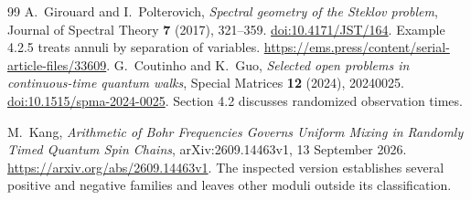 \documentclass[11pt,a4paper]{article}
\theoremstyle{definition}\newtheorem{definition}[theorem]{Definition}
\theoremstyle{remark}\newtheorem{remark}[theorem]{Remark}
\begin{document}
\begin{thebibliography}{99}
A.~Girouard and I.~Polterovich,
\emph{Spectral geometry of the Steklov problem},
Journal of Spectral Theory \textbf{7} (2017), 321--359.
\href{https://doi.org/10.4171/JST/164}{doi:10.4171/JST/164}.
Example 4.2.5 treats annuli by separation of variables.
\url{https://ems.press/content/serial-article-files/33609}.
G.~Coutinho and K.~Guo,
\emph{Selected open problems in continuous-time quantum walks},
Special Matrices \textbf{12} (2024), 20240025.
\href{https://doi.org/10.1515/spma-2024-0025}{doi:10.1515/spma-2024-0025}.
Section 4.2 discusses randomized observation times.

M.~Kang, \emph{Arithmetic of Bohr Frequencies Governs Uniform Mixing
in Randomly Timed Quantum Spin Chains}, arXiv:2609.14463v1,
13 September 2026.
\url{https://arxiv.org/abs/2609.14463v1}.
The inspected version establishes several positive and negative families
and leaves other moduli outside its classification.
\end{thebibliography}
\end{document}
